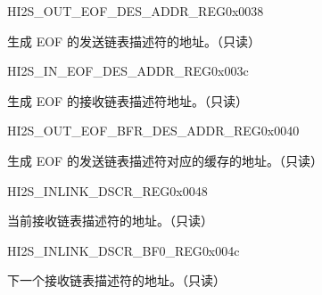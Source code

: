 \begin{register}{H}{I2S\_OUT\_EOF\_DES\_ADDR\_REG}{0x0038}\label{regdesc:I2SOUTEOFDESADDRREG}
%
\regnewline%
\begin{regdesc}\begin{reglist}
\item [I2S\_OUT\_EOF\_DES\_ADDR\_REG]生成 EOF 的发送链表描述符的地址。（只读）
\end{reglist}\end{regdesc}
\end{register}


\begin{register}{H}{I2S\_IN\_EOF\_DES\_ADDR\_REG}{0x003c}\label{regdesc:I2SINEOFDESADDRREG}
%
\regnewline%
\begin{regdesc}\begin{reglist}
\item [I2S\_IN\_EOF\_DES\_ADDR\_REG]生成 EOF 的接收链表描述符地址。（只读）
\end{reglist}\end{regdesc}
\end{register}


\begin{register}{H}{I2S\_OUT\_EOF\_BFR\_DES\_ADDR\_REG}{0x0040}\label{regdesc:I2SOUTEOFBFRDESADDRREG}
%
\regnewline%
\begin{regdesc}\begin{reglist}
\item [I2S\_OUT\_EOF\_BFR\_DES\_ADDR\_REG]生成 EOF 的发送链表描述符对应的缓存的地址。（只读）
\end{reglist}\end{regdesc}
\end{register}


\begin{register}{H}{I2S\_INLINK\_DSCR\_REG}{0x0048}\label{regdesc:I2SINLINKDSCRREG}
%
\regnewline%
\begin{regdesc}\begin{reglist}
\item [I2S\_INLINK\_DSCR\_REG] 当前接收链表描述符的地址。（只读）
\end{reglist}\end{regdesc}
\end{register}


\begin{register}{H}{I2S\_INLINK\_DSCR\_BF0\_REG}{0x004c}\label{regdesc:I2SINLINKDSCRBF0REG}
%
\regnewline%
\begin{regdesc}\begin{reglist}
\item [I2S\_INLINK\_DSCR\_BF0\_REG]下一个接收链表描述符的地址。（只读）
\end{reglist}\end{regdesc}
\end{register}


